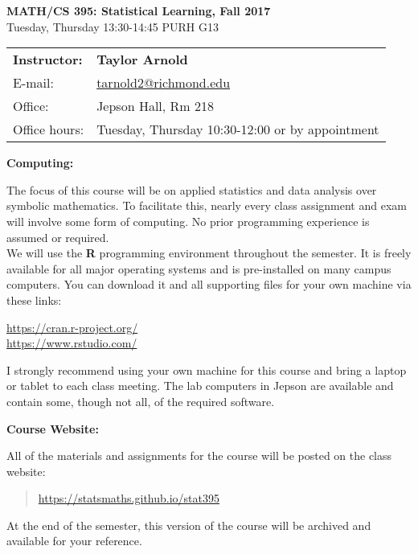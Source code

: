 \documentclass[12pt]{article}
\begin{document}
\begin{center}
{\bf MATH/CS 395: Statistical Learning, Fall 2017} \\
Tuesday, Thursday 13:30-14:45 \quad PURH G13\\
\end{center}

\bigskip

\noindent
\begin{tabular}{ l l }
{\bf Instructor:} &  {\bf Taylor Arnold} \\
E-mail: & \href{mailto:tarnold2@richmond.edu}{tarnold2@richmond.edu} \\
Office: & Jepson Hall, Rm 218 \\
Office hours: & Tuesday, Thursday 10:30-12:00 or by appointment
\end{tabular}

\vspace{0.5cm}

\textbf{Computing:} \vspace{6pt}

The focus of this course will be on applied statistics and data analysis
over symbolic mathematics. To facilitate this, nearly every class
assignment and exam will involve some form of computing.
No prior programming experience is assumed or required. \\

We will use the \textbf{R} programming environment throughout the
semester. It is freely available for all major operating systems and
is pre-installed on many campus computers. You can download it and
all supporting files for your own machine via these links:
\begin{center}
\url{https://cran.r-project.org/} \\
\url{https://www.rstudio.com/}
\end{center}
I strongly recommend using your own machine for this course and
bring a laptop or tablet to each class meeting.
The lab computers in Jepson are available and contain some, though
not all, of the required software.

\vspace{0.4cm}

\textbf{Course Website:} \vspace{6pt}

All of the materials and assignments for the course will be posted
on the class website:
\begin{quote}
\url{https://statsmaths.github.io/stat395}
\end{quote}
At the end of the semester, this version of the course
will be archived and available for your reference.
\end{document}
